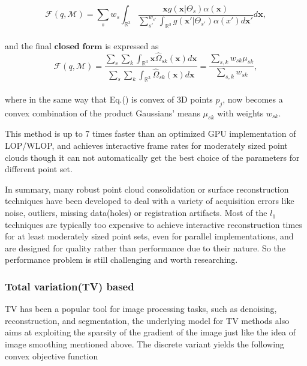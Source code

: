 \small{
\begin{equation}
 \label{eq:CLOP2}
 \mathcal{F}(q,\mathcal{M})=\sum_{s}^{}w_s\int_{\mathbb{R}^3}^{}
 \frac{\mathbf{x}g(\mathbf{x}|\Theta_{s})\alpha(\mathbf{x})}
 {\sum_{s'}^{w_{s'}}\int_{\mathbb{R}^3}^{}g(\mathbf{x'}|\Theta_{s'})\alpha(x')d\mathbf{x}'}
 d\mathbf{x},
\end{equation}
}
\\
and the final $\textbf{closed}$ $\textbf{form}$ is expressed as
\small{
\begin{equation}
 \label{eq:CLOP3}
 \mathcal{F}(q,\mathcal{M})=\frac{\sum_{s}^{}\sum_{k}^{}\int_{\mathbb{R}^3}^{}\mathbf{x}\widehat{\Omega}_{sk}(\mathbf{x})d\mathbf{x}}
 {\sum_{s}^{}\sum_{k}^{}\int_{\mathbb{R}^3}^{}\widehat{\Omega}_{sk}(\mathbf{x})d\mathbf{x}}
 =\frac{\sum_{s,k}^{}w_{sk}\mu_{sk}}
 {\sum_{s,k}^{}w_{sk}},
\end{equation}
}
\\
where in the same way that Eq.() is convex of 3D points $p_{j}$, now becomes a convex combination of the product Gaussians' means $\mu_{sk}$ with weights $w_{sk}$.

This method is up to 7 times faster than an optimized GPU implementation of LOP/WLOP, and achieves interactive frame rates for moderately sized point clouds though it can not automatically get the best choice of the parameters for different point set.

\vspace{10pt}
In summary, many robust point cloud consolidation or surface reconstruction techniques have been developed to deal with a variety of acquisition errors like noise, outliers, missing data(holes) or registration artifacts. 
Most of the $l_1$ techniques are typically too expensive to achieve interactive reconstruction times for at least moderately sized point sets, even for parallel implementations, 
and are designed for quality rather than performance due to their nature. So the performance problem is still challenging and worth researching.

\subsubsection{Total variation(TV) based}
TV has been a popular tool for image processing tasks, such as denoising, reconstruction, and segmentation\cite{chambolle2010introduction}, the underlying model for TV methods also aims at exploiting the sparsity of the gradient of the image just like the idea of image smoothing\cite{xu2011image} mentioned above. The discrete variant yields the following convex objective function

